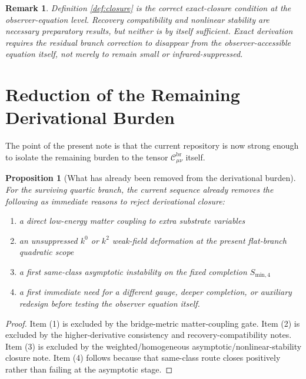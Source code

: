 \documentclass[11pt]{article}
\newtheorem{proposition}{Proposition}
\newtheorem{remark}{Remark}
\begin{document}
\begin{remark}
Definition \ref{def:closure} is the correct exact-closure condition at the observer-equation level. Recovery compatibility and nonlinear stability are necessary preparatory results, but neither is by itself sufficient. Exact derivation requires the residual branch correction to disappear from the observer-accessible equation itself, not merely to remain small or infrared-suppressed.
\end{remark}

\section{Reduction of the Remaining Derivational Burden}

The point of the present note is that the current repository is now strong enough to isolate the remaining burden to the tensor \(\mathcal C_{\mu\nu}^{\mathrm{br}}\) itself.

\begin{proposition}[What has already been removed from the derivational burden]
\label{prop:removed}
For the surviving quartic branch, the current sequence already removes the following as immediate reasons to reject derivational closure:
\begin{enumerate}
    \item a direct low-energy matter coupling to extra substrate variables
    \item an unsuppressed \(k^0\) or \(k^2\) weak-field deformation at the present flat-branch quadratic scope
    \item a first same-class asymptotic instability on the fixed completion \(S_{\mathrm{min},4}\)
    \item a first immediate need for a different gauge, deeper completion, or auxiliary redesign before testing the observer equation itself.
\end{enumerate}
\end{proposition}

\begin{proof}
Item (1) is excluded by the bridge-metric matter-coupling gate. Item (2) is excluded by the higher-derivative consistency and recovery-compatibility notes. Item (3) is excluded by the weighted/homogeneous asymptotic/nonlinear-stability closure note. Item (4) follows because that same-class route closes positively rather than failing at the asymptotic stage.
\end{proof}
\end{document}
